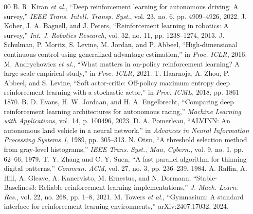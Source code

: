 \documentclass[conference]{IEEEtran}
\begin{document}
\begin{thebibliography}{00}
 B. R. Kiran \textit{et al.}, ``Deep reinforcement learning for autonomous driving: A survey,'' \textit{IEEE Trans. Intell. Transp. Syst.}, vol. 23, no. 6, pp. 4909--4926, 2022.
 J. Kober, J. A. Bagnell, and J. Peters, ``Reinforcement learning in robotics: A survey,'' \textit{Int. J. Robotics Research}, vol. 32, no. 11, pp. 1238--1274, 2013.
 J. Schulman, P. Moritz, S. Levine, M. Jordan, and P. Abbeel, ``High-dimensional continuous control using generalized advantage estimation,'' in \textit{Proc. ICLR}, 2016.
 M. Andrychowicz \textit{et al.}, ``What matters in on-policy reinforcement learning? A large-scale empirical study,'' in \textit{Proc. ICLR}, 2021.
 T. Haarnoja, A. Zhou, P. Abbeel, and S. Levine, ``Soft actor-critic: Off-policy maximum entropy deep reinforcement learning with a stochastic actor,'' in \textit{Proc. ICML}, 2018, pp. 1861--1870.
 B. D. Evans, H. W. Jordaan, and H. A. Engelbrecht, ``Comparing deep reinforcement learning architectures for autonomous racing,'' \textit{Machine Learning with Applications}, vol. 14, p. 100496, 2023.
 D. A. Pomerleau, ``ALVINN: An autonomous land vehicle in a neural network,'' in \textit{Advances in Neural Information Processing Systems 1}, 1989, pp. 305--313.
 N. Otsu, ``A threshold selection method from gray-level histograms,'' \textit{IEEE Trans. Syst., Man, Cybern.}, vol. 9, no. 1, pp. 62--66, 1979.
 T. Y. Zhang and C. Y. Suen, ``A fast parallel algorithm for thinning digital patterns,'' \textit{Commun. ACM}, vol. 27, no. 3, pp. 236--239, 1984.
 A. Raffin, A. Hill, A. Gleave, A. Kanervisto, M. Ernestus, and N. Dormann, ``Stable-Baselines3: Reliable reinforcement learning implementations,'' \textit{J. Mach. Learn. Res.}, vol. 22, no. 268, pp. 1--8, 2021.
 M. Towers \textit{et al.}, ``Gymnasium: A standard interface for reinforcement learning environments,'' arXiv:2407.17032, 2024.
\end{thebibliography}
\end{document}
